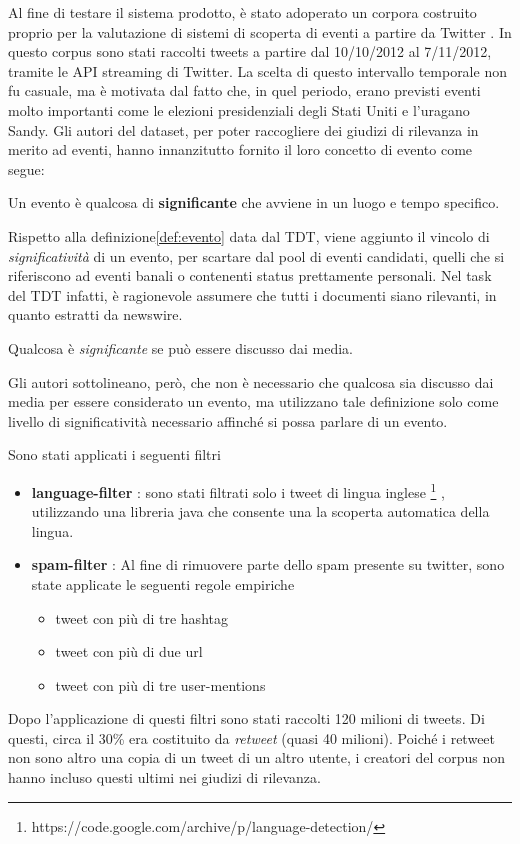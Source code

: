 Al fine di testare il sistema prodotto, è stato adoperato un corpora costruito proprio per la valutazione di sistemi
di scoperta di eventi a partire da Twitter \cite{McMinn:2013:BLC:2505515.2505695}.
In questo corpus sono stati raccolti tweets a partire dal 10/10/2012 al 7/11/2012, tramite le API streaming di Twitter.
La scelta di questo intervallo temporale non  fu casuale, ma   è motivata dal fatto che, in quel periodo, erano previsti eventi molto importanti come le elezioni presidenziali degli Stati Uniti e l'uragano Sandy.
Gli autori del dataset, per poter raccogliere dei giudizi di rilevanza in merito ad eventi, hanno innanzitutto fornito il loro concetto di evento come segue:
\begin{definizione}[ ]
\label{def:eventoDataset}
Un evento è qualcosa di \textbf{significante}  che avviene in un luogo e tempo specifico.
\end{definizione}
Rispetto alla definizione\ref{def:evento} data dal TDT, viene aggiunto il vincolo di \emph{significatività} di un evento, per scartare dal pool di eventi candidati, quelli che si riferiscono ad eventi banali o contenenti status prettamente personali. Nel task del TDT infatti, è ragionevole assumere che tutti i documenti siano rilevanti, in quanto estratti da newswire.
\begin{definizione}
Qualcosa è \emph{significante} se può essere discusso dai media.
\end{definizione}
Gli autori sottolineano, però, che non è necessario che qualcosa sia discusso dai media per essere considerato un evento, ma utilizzano tale definizione solo come livello di significatività necessario affinché si possa parlare di un evento.





Sono stati applicati i seguenti filtri 
\begin{itemize}
	\item \textbf{language-filter} :  sono stati filtrati solo i tweet di lingua inglese \footnote{https://code.google.com/archive/p/language-detection/}
, utilizzando una libreria java che consente una la scoperta automatica della lingua.
\item \textbf{spam-filter} : 
Al fine di rimuovere parte dello spam presente su twitter, sono state applicate le seguenti regole empiriche \cite{Benevenuto10detectingspammers}
    \begin{itemize}
	\item tweet con più di tre hashtag
	\item tweet con più di due url
	\item tweet con più di tre user-mentions
	\end{itemize}
\end{itemize}
Dopo l'applicazione di questi filtri sono stati raccolti 120 milioni di tweets.
Di questi, circa il 30\% era costituito da  \emph{retweet} (quasi 40 milioni). Poiché i retweet non sono  altro una copia di un tweet di un altro utente, i creatori del corpus non hanno incluso questi ultimi nei giudizi di rilevanza. 
